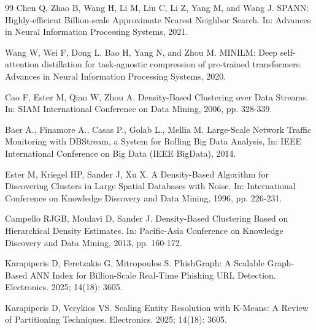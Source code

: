 \documentclass[journal,article,submit,pdftex,moreauthors]{Definitions/mdpi}
\begin{document}
\begin{thebibliography}{99}
Chen Q, Zhao B, Wang H, Li M, Liu C, Li Z, Yang M, and Wang J. SPANN: Highly-efficient Billion-scale Approximate Nearest Neighbor Search. In: Advances in Neural Information Processing Systems, 2021.

Wang W, Wei F, Dong L. Bao H, Yang N, and Zhou M. MINILM: Deep self-attention distillation for task-agnostic compression of pre-trained transformers. Advances in Neural Information Processing Systems, 2020.

Cao F, Ester M, Qian W, Zhou A. Density-Based Clustering over Data Streams. In: SIAM International Conference on Data Mining, 2006, pp. 328-339.

Baer A., Finamore A., Casas P.,  Golab L.,  Mellia M. Large-Scale Network Traffic Monitoring with DBStream, a System for Rolling Big Data Analysis, In: IEEE International Conference on Big Data (IEEE BigData), 2014.

Ester M, Kriegel HP, Sander J, Xu X. A Density-Based Algorithm for Discovering Clusters in Large Spatial Databases with Noise. In: International Conference on Knowledge Discovery and Data Mining, 1996, pp. 226-231.

Campello RJGB, Moulavi D, Sander J. Density-Based Clustering Based on Hierarchical Density Estimates. In: Pacific-Asia Conference on Knowledge Discovery and Data Mining, 2013, pp. 160-172.

Karapiperis D, Feretzakis G, Mitropoulos S. PhishGraph: A Scalable Graph-Based ANN Index for Billion-Scale Real-Time Phishing URL Detection. Electronics. 2025; 14(18): 3605.

Karapiperis D, Verykios VS. Scaling Entity Resolution with K-Means: A Review of Partitioning Techniques. Electronics. 2025; 14(18): 3605.

\end{thebibliography}
\end{document}
